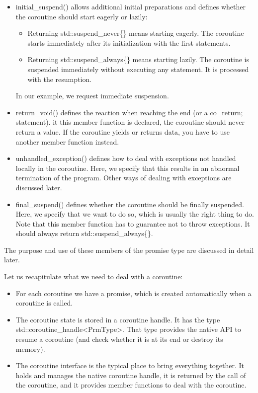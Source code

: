 \begin{itemize}
\item 
initial\_suspend() allows additional initial preparations and defines whether the coroutine should start eagerly or lazily:

\begin{itemize}
\item 
Returning std::suspend\_never\{\} means starting eagerly. The coroutine starts immediately after its initialization with the first statements.

\item 
Returning std::suspend\_always\{\} means starting lazily. The coroutine is suspended immediately without executing any statement. It is processed with the resumption.
\end{itemize}

In our example, we request immediate suspension.

\item 
return\_void() defines the reaction when reaching the end (or a co\_return; statement). it this member function is declared, the coroutine should never return a value. If the coroutine yields or returns data, you have to use another member function instead.

\item 
unhandled\_exception() defines how to deal with exceptions not handled locally in the coroutine. Here, we specify that this results in an abnormal termination of the program. Other ways of dealing with exceptions are discussed later.

\item
final\_suspend() defines whether the coroutine should be finally suspended. Here, we specify that we want to do so, which is usually the right thing to do. Note that this member function has to guarantee not to throw exceptions. It should always return std::suspend\_always\{\}.
\end{itemize}

The purpose and use of these members of the promise type are discussed in detail later.


Let us recapitulate what we need to deal with a coroutine:

\begin{itemize}
\item 
For each coroutine we have a promise, which is created automatically when a coroutine is called.

\item 
The coroutine state is stored in a coroutine handle. It has the type std::coroutine\_handle<PrmType>. That type provides the native API to resume a coroutine (and check whether it is at its end or destroy its memory).

\item 
The coroutine interface is the typical place to bring everything together. It holds and manages the native coroutine handle, it is returned by the call of the coroutine, and it provides member functions to deal with the coroutine.
\end{itemize}

